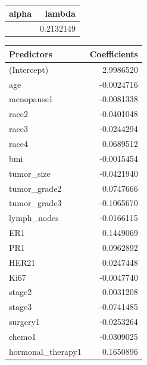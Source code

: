 \documentclass[
]{article}
\newenvironment{Shaded}{\begin{snugshade}}{\end{snugshade}}
\newcommand{\CommentTok}[1]{\textcolor[rgb]{0.56,0.35,0.01}{\textit{#1}}}
\newcommand{\ConstantTok}[1]{\textcolor[rgb]{0.56,0.35,0.01}{#1}}
\newcommand{\DecValTok}[1]{\textcolor[rgb]{0.00,0.00,0.81}{#1}}
\newcommand{\FunctionTok}[1]{\textcolor[rgb]{0.13,0.29,0.53}{\textbf{#1}}}
\newcommand{\NormalTok}[1]{#1}
\newcommand{\OtherTok}[1]{\textcolor[rgb]{0.56,0.35,0.01}{#1}}
\newcommand{\SpecialCharTok}[1]{\textcolor[rgb]{0.81,0.36,0.00}{\textbf{#1}}}
\newcommand{\StringTok}[1]{\textcolor[rgb]{0.31,0.60,0.02}{#1}}
\begin{document}
\begin{longtable}[]{@{}rr@{}}
\toprule\noalign{}
alpha & lambda \\
\midrule\noalign{}
\endhead
\bottomrule\noalign{}
\endlastfoot
0 & 0.2132149 \\
\end{longtable}

\begin{Shaded}
\end{Shaded}

\begin{longtable}[]{@{}lr@{}}
\toprule\noalign{}
Predictors & Coefficients \\
\midrule\noalign{}
\endhead
\bottomrule\noalign{}
\endlastfoot
(Intercept) & 2.9986520 \\
age & -0.0024716 \\
menopause1 & -0.0081338 \\
race2 & -0.0401048 \\
race3 & -0.0244294 \\
race4 & 0.0689512 \\
bmi & -0.0015454 \\
tumor\_size & -0.0421940 \\
tumor\_grade2 & 0.0747666 \\
tumor\_grade3 & -0.1065670 \\
lymph\_nodes & -0.0166115 \\
ER1 & 0.1449069 \\
PR1 & 0.0962892 \\
HER21 & 0.0247448 \\
Ki67 & -0.0047740 \\
stage2 & 0.0031208 \\
stage3 & -0.0741485 \\
surgery1 & -0.0253264 \\
chemo1 & -0.0309025 \\
hormonal\_therapy1 & 0.1650896 \\
\end{longtable}
\end{document}
